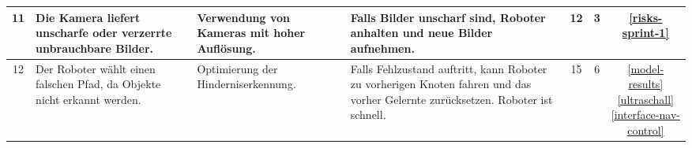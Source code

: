 \begin{table}[H]
\begin{tabularx}{\textwidth}{|c|X|X|X|c|c|c|}
  \hline
      11&Die Kamera liefert unscharfe oder verzerrte unbrauchbare Bilder. &Verwendung von Kameras mit hoher Auflösung.&Falls Bilder unscharf sind, Roboter anhalten und neue Bilder aufnehmen.&12&3&\ref{risks-sprint-1} \\
  \hline
        12& Der Roboter wählt einen falschen Pfad, da Objekte nicht erkannt werden. &Optimierung der Hinderniserkennung.& Falls Fehlzustand auftritt, kann Roboter zu vorherigen Knoten fahren und das vorher Gelernte zurücksetzen. Roboter ist schnell.&15& 6&\makecell{\ref{model-results} \\ \ref{ultraschall}\\ \ref{interface-nav-control}}\\
  \hline

\end{tabularx}
\end{table}

\newpage

